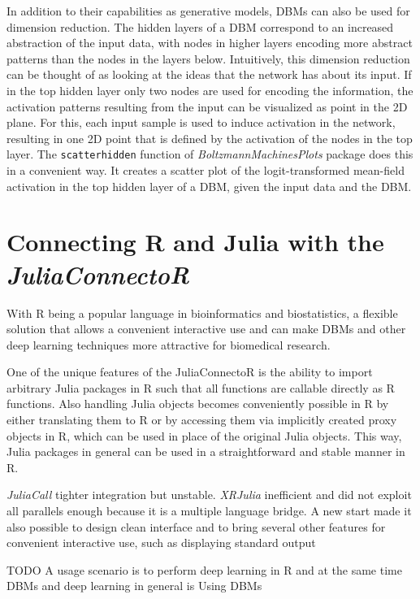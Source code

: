 \documentclass[12pt]{article}
\newcommand{\inlinecode}[1]{\texttt{#1}}
\newcommand{\apkg}[1]{\emph{#1}}
\begin{document}
In addition to their capabilities as generative models, DBMs can also be used for dimension reduction.
The hidden layers of a DBM correspond to an increased abstraction of the input data,
with nodes in higher layers encoding more abstract patterns than the nodes in the layers below.
Intuitively, this dimension reduction can be thought of as looking at the ideas that the network has about its input.
If in the top hidden layer only two nodes are used for encoding the information, the activation patterns resulting from the input can be visualized as point in the 2D plane.
For this, each input sample is used to induce activation in the network, resulting in one 2D point that is defined by the activation of the nodes in the top layer.
The \inlinecode{scatterhidden} function of \apkg{BoltzmannMachinesPlots} package does this in a convenient way.
It creates a scatter plot of the logit-transformed mean-field activation in the top hidden layer of a DBM, given the input data and the DBM.



\FloatBarrier
\clearpage
\section{Connecting R and Julia with the \apkg{JuliaConnectoR}}

With R being a popular language in bioinformatics and biostatistics, a flexible solution that allows a convenient interactive use and can make DBMs and other deep learning techniques more attractive for biomedical research.


One of the unique features of the JuliaConnectoR is the ability to import arbitrary Julia packages in R such that all functions are callable directly as R functions.
Also handling Julia objects becomes conveniently possible in R by either translating them to R or by accessing them via implicitly created proxy objects in R, which can be used in place of the original Julia objects.
This way, Julia packages in general can be used in a straightforward and stable manner in R.

\apkg{JuliaCall} tighter integration but unstable.
\apkg{XRJulia} inefficient and did not exploit all parallels enough because it is a multiple language bridge.
A new start made it also possible to design clean interface and to bring several other features for convenient interactive use, such as displaying standard output

TODO A usage scenario is to perform deep learning in R and at the same time 
DBMs and deep learning in general is 
Using DBMs
\end{document}
